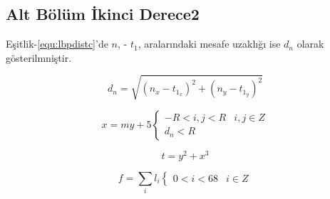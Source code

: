 
\newpage
\subsection{Alt Bölüm İkinci Derece2}


\lipsum[11-14]

Eşitlik-\ref{equ:lbpdistc}'de  $n$, - $t_1$, aralarındaki mesafe uzaklığı ise $d_n$ olarak gösterilmniştir.

\begin{equation}
  d_n = \sqrt{{(n_x - t_{1_x})^2}+{(n_y - t_{1_y})^2}}
 \label{equ:lbpdistc}
\end{equation}

\lipsum[5]

\begin{equation}
x = my+5 \begin{cases}
-R< i,j<R &\text{$i,j\in Z$}\\
{d_n}<R
\end{cases}
\label{equ:lbpcalc}
\end{equation}

\lipsum[6]



\begin{equation}
    t = y^2 + x^3
    \label{eq:lbp}%
\end{equation}

\lipsum[16]

\begin{equation}
f = \sum_{i} l_{i} \begin{cases}
 0< i<68 &\text{$i\in Z$}
\end{cases}
\label{eq:4}%
\end{equation}

